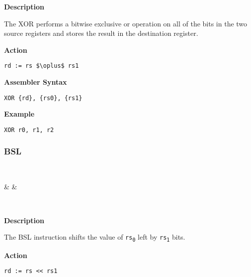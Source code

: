 \textbf{Description}

The XOR performs a bitwise exclusive or operation on all of the bits in the two source registers and stores the result in the destination register.

\vspace{3ex}

\textbf{Action}
\begin{lstlisting}[frame=single]
	rd := rs $\oplus$ rs1
\end{lstlisting}

\vspace{3ex}

\textbf{Assembler Syntax}
\begin{lstlisting}[frame=single]
	XOR {rd}, {rs0}, {rs1}
\end{lstlisting}

\vspace{3ex}

\textbf{Example}
\begin{lstlisting}[frame=single]
	XOR r0, r1, r2
\end{lstlisting}

\subsubsection{BSL }\label{sec:BSL}

\vspace{3ex}

\begin{center}
	\begin{bytefield}[leftcurly=., leftcurlyspace=0pt]{32}
		 \\
		\begin{leftwordgroup}{}
			 & 
			 &
		\end{leftwordgroup}\\
	\end{bytefield}
\end{center}

\textbf{Description}

The BSL instruction shifts the value of \texttt{rs\textsubscript{0}} left by \texttt{rs\textsubscript{1}} bits.

\vspace{3ex}

\textbf{Action}
\begin{lstlisting}[frame=single]
	rd := rs << rs1
\end{lstlisting}

